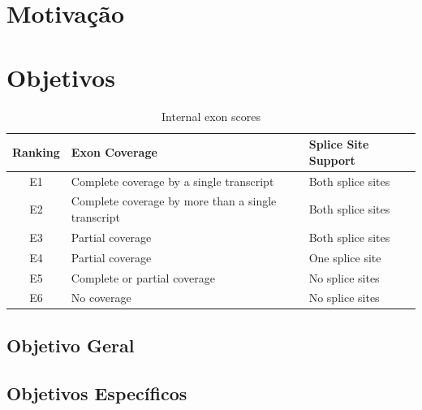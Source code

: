 \lipsum[2]
\lipsum[2]

\section{Motivação}
\lipsum[2]
\lipsum[2]

\section{Objetivos}

\lipsum[2]

\begin{table}[h!]	
	\caption{Internal exon scores}
	\label{tab:internal}
	\centering
	\begin{tabular}{|c|l|l|}
		\hline
		Ranking & Exon Coverage & Splice Site Support\\
		\hline
		E1 & Complete coverage by a single transcript & Both splice sites\\
		E2 & Complete coverage by more than a single transcript & Both splice sites\\
		E3 & Partial coverage & Both splice sites\\
		E4 & Partial coverage & One splice site\\
		E5 & Complete or partial coverage & No splice sites\\
		E6 & No coverage & No splice sites\\
		\hline
	\end{tabular}
\end{table}

\lipsum[2]
\subsection{Objetivo Geral}
\lipsum[2]

\subsection{Objetivos Específicos}
	\lipsum[2]
	
	\begin{alineas}
		\item \lipsum[2]
		\item \lipsum[2]
		\begin{alineas}
			\item \lipsum[2]
			\item \lipsum[2]
		\end{alineas}
		\item \lipsum[2]	
	\end{alineas}
	
